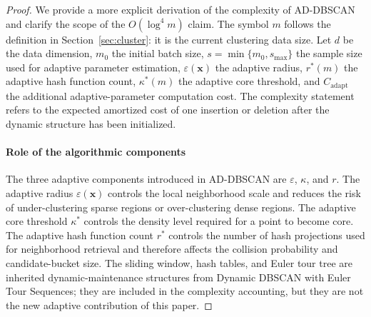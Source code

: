 \documentclass[preprint,12pt,authoryear]{elsarticle}
\theoremstyle{definition}
\begin{document}
\begin{proof}

We provide a more explicit derivation of the complexity of AD-DBSCAN and clarify the scope of the $O(\log^4 m)$ claim. The symbol $m$ follows the definition in Section~\ref{sec:cluster}: it is the current clustering data size. Let $d$ be the data dimension, $m_0$ the initial batch size, $s=\min\{m_0,s_{\max}\}$ the sample size used for adaptive parameter estimation, $\varepsilon(\bm{x})$ the adaptive radius, $r^*(m)$ the adaptive hash function count, $\kappa^*(m)$ the adaptive core threshold, and $C_{\mathrm{adapt}}$ the additional adaptive-parameter computation cost. The complexity statement refers to the expected amortized cost of one insertion or deletion after the dynamic structure has been initialized.

\paragraph{Role of the algorithmic components}
The three adaptive components introduced in AD-DBSCAN are $\varepsilon$, $\kappa$, and $r$. The adaptive radius $\varepsilon(\bm{x})$ controls the local neighborhood scale and reduces the risk of under-clustering sparse regions or over-clustering dense regions. The adaptive core threshold $\kappa^*$ controls the density level required for a point to become core. The adaptive hash function count $r^*$ controls the number of hash projections used for neighborhood retrieval and therefore affects the collision probability and candidate-bucket size. The sliding window, hash tables, and Euler tour tree are inherited dynamic-maintenance structures from Dynamic DBSCAN with Euler Tour Sequences; they are included in the complexity accounting, but they are not the new adaptive contribution of this paper.


\end{proof}
\end{document}

